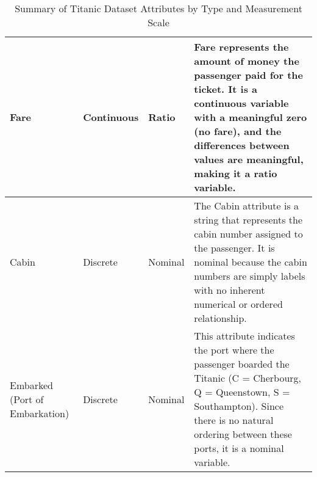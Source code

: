 \documentclass[twoside, 11pt]{article}
\begin{document}
\begin{table}[h!]
\begin{tabular}{|l|l|l|p{8cm}|}
	Fare & Continuous & Ratio & Fare represents the amount of money the passenger paid for the ticket. It is a continuous variable with a meaningful zero (no fare), and the differences between values are meaningful, making it a ratio variable. \\ \hline
	Cabin & Discrete & Nominal & The Cabin attribute is a string that represents the cabin number assigned to the passenger. It is nominal because the cabin numbers are simply labels with no inherent numerical or ordered relationship. \\ \hline
	Embarked (Port of Embarkation) & Discrete & Nominal & This attribute indicates the port where the passenger boarded the Titanic (C = Cherbourg, Q = Queenstown, S = Southampton). Since there is no natural ordering between these ports, it is a nominal variable. \\ \hline
	\end{tabular}
	\caption{Summary of Titanic Dataset Attributes by Type and Measurement Scale}
	\label{table:description}
\end{table}
\end{document}
